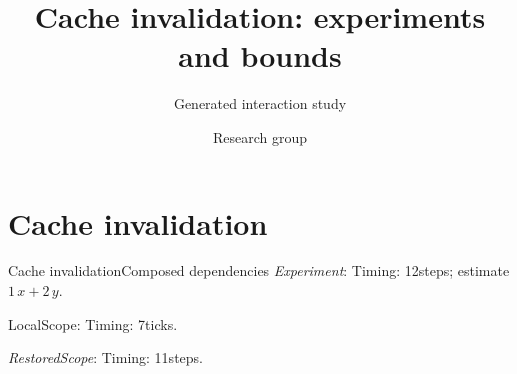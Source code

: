 \documentclass[9pt,aspectratio=169]{beamer}
\title{Cache invalidation: experiments and bounds}
\subtitle{Generated interaction study}
\author{Research group}
\date{}
\newcommand{\fuzzlayerA}[1]{\textit{#1}}
\newcommand{\fuzzlayerB}[1]{\fuzzlayerA{#1}}
\newcommand{\fuzzterm}[1]{\fuzzlayerB{#1}}
\newcommand{\fuzzpair}[2]{\fuzzterm{#1}: #2}
\newcommand{\fuzzunit}{steps}
\newcommand{\fuzzcoefficient}{1}
\newcommand{\fuzzscale}[2][\fuzzcoefficient]{#1\,#2}
\begin{document}
\section{Cache invalidation}
\begin{frame}[t,shrink=5]{Cache invalidation}{Composed dependencies}
\fuzzpair{Experiment}{Timing: 12\fuzzunit; estimate $\fuzzscale{x}+\fuzzscale[2]{y}$.}\par
{\renewcommand{\fuzzunit}{ticks}\let\fuzzterm\textrm\fuzzpair{LocalScope}{Timing: 7\fuzzunit.}\par}
\fuzzpair{RestoredScope}{Timing: 11\fuzzunit.}\par
{}
\end{frame}
\end{document}
